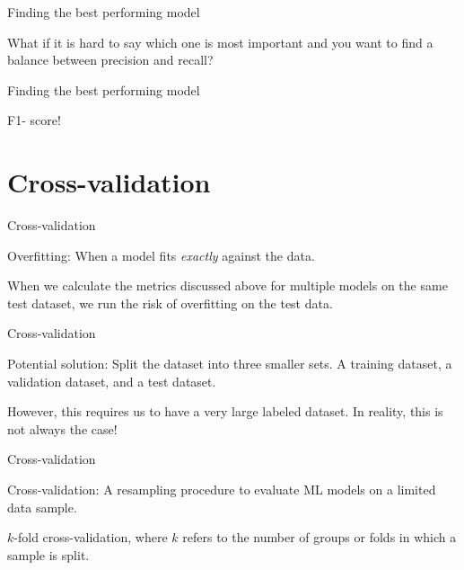 \documentclass[handout]{beamer}
\begin{document}
\begin{frame}{Finding the best performing model}

What if it is hard to say which one is most important and you want to find a balance between precision and recall?

		
\end{frame}


\begin{frame}{Finding the best performing model}

F1- score!
	
\end{frame}


\section{Cross-validation}

\begin{frame}{Cross-validation}
	
	Overfitting: When a model fits \emph{exactly} against the data.
	
	When we calculate the metrics discussed above for multiple models on the same test dataset, we run the risk of overfitting on the test data.

	
\end{frame}


\begin{frame}{Cross-validation}
	
	Potential solution: Split the dataset into three smaller sets. A training dataset, a validation dataset, and a test dataset.
	
	However, this requires us to have a very large labeled dataset. In reality, this is not always the case!
	
\end{frame}


\begin{frame}{Cross-validation}
	
	Cross-validation: A resampling procedure to evaluate ML models on a limited data sample.
	
	\(k\)-fold cross-validation, where \(k\) refers to the number of groups or folds in which a sample is split.

\end{frame}
\end{document}
